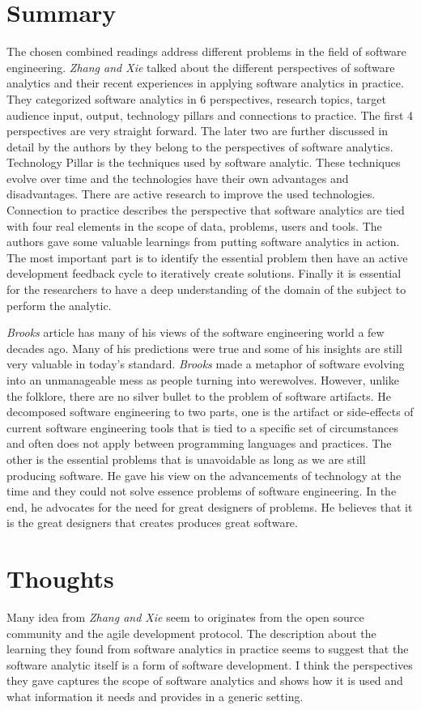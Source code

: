 \documentclass[sigconf]{acmart}
\begin{document}
\section{Summary}
The chosen combined readings address different problems in the field of software engineering. {\it Zhang and Xie} talked about the different perspectives of software analytics and their recent experiences in applying software analytics in practice. They categorized software analytics in 6 perspectives, research topics, target audience input, output, technology pillars and connections to practice. The first 4 perspectives are very straight forward. The later two are further discussed in detail by the authors by they belong to the perspectives of software analytics. Technology Pillar is the techniques used by software analytic. These techniques evolve over time and the technologies have their own advantages and disadvantages. There are active research to improve the used technologies. Connection to practice describes the perspective that software analytics are tied with four real elements in the scope of data, problems, users and tools. The authors gave some valuable learnings from putting software analytics in action. The most important part is to identify the essential problem then have an active development feedback cycle to iteratively create solutions. Finally it is essential for the researchers to have a deep understanding of the domain of the subject to perform the analytic. 

{\it Brooks} article has many of his views of the software engineering world a few decades ago. Many of his predictions were true and some of his insights are still very valuable in today's standard. {\it Brooks} made a metaphor of software evolving into an unmanageable mess as people turning into werewolves. However, unlike the folklore, there are no silver bullet to the problem of software artifacts. He decomposed software engineering to two parts, one is the artifact or side-effects of current software engineering tools that is tied to a specific set of circumstances and often does not apply between programming languages and practices. The other is the essential problems that is unavoidable as long as we are still producing software. He gave his view on the advancements of technology at the time and they could not solve essence problems of software engineering. In the end, he advocates for the need for great designers of problems. He believes that it is the great designers that creates produces great software.

\section{Thoughts}
Many idea from {\it Zhang and Xie} seem to originates from the open source community and the agile development protocol. The description about the learning they found from software analytics in practice seems to suggest that the software analytic itself is a form of software development. I think the perspectives they gave captures the scope of software analytics and shows how it is used and what information it needs and provides in a generic setting. 
\end{document}
